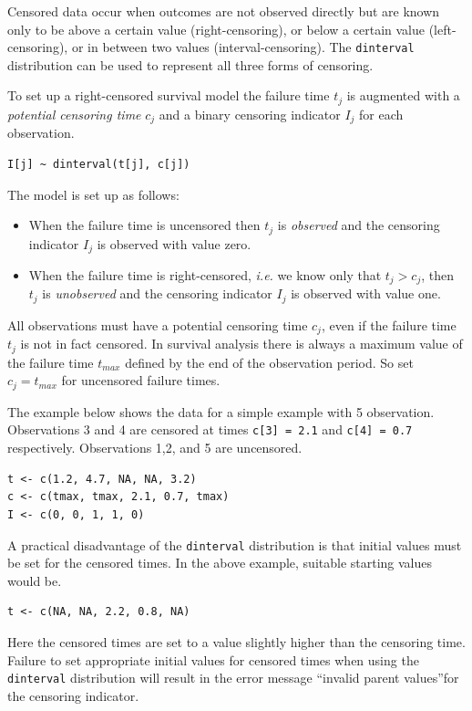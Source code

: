 \documentclass[11pt, a4paper, titlepage]{report}
\begin{document}
{Censored data occur when outcomes are not observed directly but are
known only to be above a certain value (right-censoring), or below a
certain value (left-censoring), or in between two values
(interval-censoring). The \texttt{dinterval} distribution can be used
to represent all three forms of censoring.

To set up a right-censored survival model the failure time $t_j$ is
augmented with a {\em potential censoring time} $c_j$ and a binary
censoring indicator $I_j$ for each observation.
\begin{verbatim}
I[j] ~ dinterval(t[j], c[j])
\end{verbatim}
The model is set up as follows:
\begin{itemize}
\item When the failure time is uncensored then $t_j$ is {\em observed}
  and the censoring indicator $I_j$ is observed with value zero.
\item When the failure time is right-censored, {\em i.e.} we know only
  that $t_j > c_j$, then $t_j$ is {\em unobserved} and the censoring
  indicator $I_j$ is observed with value one.
\end{itemize}
All observations must have a potential censoring time $c_j$, even if
the failure time $t_j$ is not in fact censored.  In survival analysis
there is always a maximum value of the failure time $t_{max}$ defined
by the end of the observation period. So set $c_j = t_{max}$ for
uncensored failure times.

The example below shows the data for a simple example with 5 observation.
Observations 3 and 4 are censored at times \verb+c[3] = 2.1+ and
\verb+c[4] = 0.7+ respectively. Observations 1,2, and 5 are uncensored.
\begin{verbatim}
t <- c(1.2, 4.7, NA, NA, 3.2)
c <- c(tmax, tmax, 2.1, 0.7, tmax)
I <- c(0, 0, 1, 1, 0)
\end{verbatim}
A practical disadvantage of the \texttt{dinterval} distribution is that
initial values must be set for the censored times. In the above example,
suitable starting values would be. %
\begin{verbatim}
t <- c(NA, NA, 2.2, 0.8, NA)
\end{verbatim}
Here the censored times are set to a value slightly higher than the
censoring time. Failure to set appropriate initial values for censored
times when using the \texttt{dinterval} distribution will result in
the error message ``invalid parent values''for the censoring
indicator.

}
\end{document}
